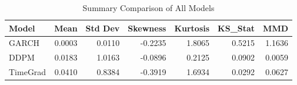 \begin{table}
\caption{Summary Comparison of All Models}
\label{tab:summary_comparison}
\begin{tabular}{lrrrrrr}
\toprule
Model & Mean & Std Dev & Skewness & Kurtosis & KS_Stat & MMD \\
\midrule
GARCH & 0.0003 & 0.0110 & -0.2235 & 1.8065 & 0.5215 & 1.1636 \\
DDPM & 0.0183 & 1.0163 & -0.0896 & 0.2125 & 0.0902 & 0.0059 \\
TimeGrad & 0.0410 & 0.8384 & -0.3919 & 1.6934 & 0.0292 & 0.0627 \\
\bottomrule
\end{tabular}
\end{table}

